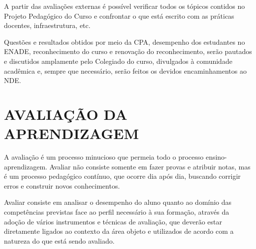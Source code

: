 \documentclass{paper}
\begin{document}
A partir das avaliações externas é possível verificar todos os tópicos contidos no Projeto Pedagógico do Curso e confrontar o que está escrito com as práticas docentes, infraestrutura, etc. 

Questões e resultados obtidos por meio da CPA, desempenho dos estudantes no ENADE, reconhecimento do curso e renovação do reconhecimento, serão pautados e discutidos amplamente pelo Colegiado do curso, divulgados à comunidade acadêmica e, sempre que necessário, serão feitos os devidos encaminhamentos ao NDE. 





\clearpage
\section{AVALIAÇÃO DA APRENDIZAGEM}

A avaliação é um processo minucioso que permeia todo o processo ensino-aprendizagem. Avaliar não consiste somente em fazer provas e atribuir notas, mas é um processo pedagógico contínuo, que ocorre dia após dia, buscando corrigir erros e construir novos conhecimentos.

Avaliar consiste em analisar o desempenho do aluno quanto ao domínio das competências previstas face ao perfil necessário à sua formação, através da adoção de vários instrumentos e técnicas de avaliação, que deverão estar diretamente ligados ao contexto da área objeto e utilizados de acordo com a natureza do que está sendo avaliado.
\end{document}
